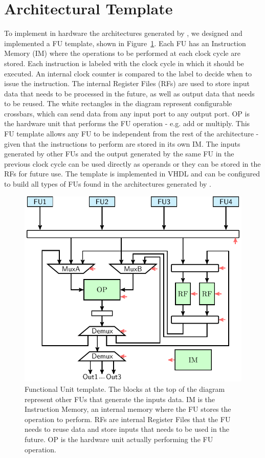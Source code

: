 \section{Architectural Template}
\label{sec:arch_template}
To implement in hardware the architectures generated by \frameworkname, we designed and implemented a FU template, shown in Figure~\ref{fig:FU_templ}. Each FU has an Instruction Memory (IM) where the operations to be performed at each clock cycle are stored. Each instruction is labeled with the clock cycle in which it should be executed. An internal clock counter is compared to the label to decide when to issue the instruction. The internal Register Files (RFs) are used to store input data that needs to be processed in the future, as well as output data that needs to be reused. The white rectangles in the diagram represent configurable crossbars, which can send data from any input port to any output port. OP is the hardware unit that performs the FU operation - e.g. add or multiply. 
This FU template allows any FU to be independent from the rest of the architecture - given that the instructions to perform are stored in its own IM. The inputs generated by other FUs and the output generated by the same FU in the previous clock cycle can be used directly as operands or they can be stored in the RFs for future use. 
The template is implemented in VHDL and can be configured to build all types of FUs found in the architectures generated by \frameworkname.

\begin{figure}[tb] 
\centering
\includegraphics[width=.8\columnwidth]{images/functional_unit.pdf}
    \caption{\small Functional Unit template. The blocks at the top of the diagram represent other FUs that generate the inputs data. IM is the Instruction Memory, an internal memory where the FU stores the operation to perform. RFs are internal Register Files that the FU needs to reuse data and store inputs that needs to be used in the future. OP is the hardware unit actually performing the FU operation.}
\label{fig:FU_templ}
\end{figure}

